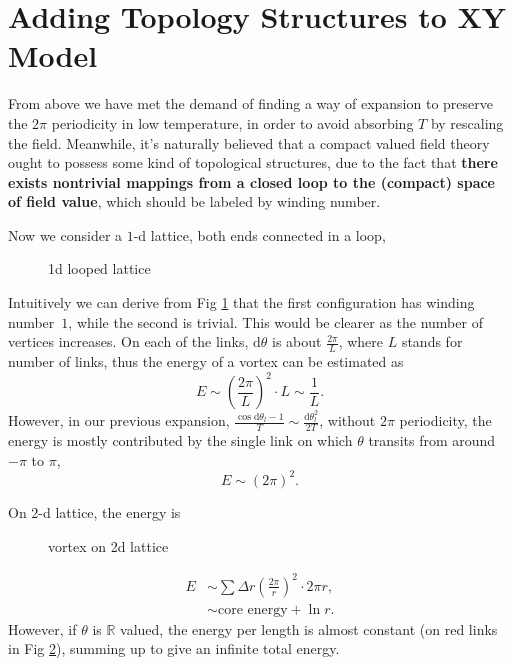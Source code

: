 
\section{Adding Topology Structures to XY Model}

From above we have met the demand of finding a way of expansion to preserve the $2\pi $ periodicity in low temperature, in order to avoid absorbing $T$ by rescaling the field. Meanwhile, it's naturally believed that a compact valued field theory ought to possess some kind of topological structures, due to the fact that \textbf{there exists nontrivial mappings from a closed loop to the (compact) space of field value}, which should be labeled by winding number.

Now we consider a $1$-d lattice, both ends connected in a loop,

\begin{figure}[ht]
    \centering
    \caption{1d looped lattice}
    \label{fig:1d-looped-lattice}
\end{figure}
Intuitively we can derive from Fig \ref{fig:1d-looped-lattice} that the first configuration has winding number~$1$, while the second is trivial. This would be clearer as the number of vertices increases. 
On each of the links, $\mathrm{d} \theta$ is about $\frac{2\pi }{L}$, where $L$ stands for number of links, thus the energy of a vortex can be estimated as
\begin{equation}
  E \sim \left( \frac{2\pi }{L} \right)^{2} \cdot L \sim \frac{1}{L}.
\end{equation}
However, in our previous expansion, $\frac{\cos \mathrm{d} \theta_{l}-1}{T} \sim \frac{\mathrm{d} \theta_{l}^{2}}{2T}$, without $2\pi $ periodicity, the energy is mostly contributed by the single link on which $\theta$ transits from around $-\pi $ to $\pi $,
\begin{equation}
  E \sim \left( 2\pi  \right)^{2}.
\end{equation}

On $2$-d lattice, the energy is
\begin{figure}[ht]
    \centering
    \caption{vortex on 2d lattice}
    \label{fig:vortex-on-2d-lattice}
\end{figure}
\begin{equation}
  \begin{aligned}
    E  & \sim \sum \Delta r \left( \frac{2\pi }{r} \right)^{2} \cdot 2\pi  r ,\\
       & \sim \text{core energy} + \ln r.
  \end{aligned}
\end{equation}
However, if $\theta$ is $\mathbb{R}$ valued, the energy per length is almost constant (on red links in Fig \ref{fig:vortex-on-2d-lattice}), summing up to give an infinite total energy.

